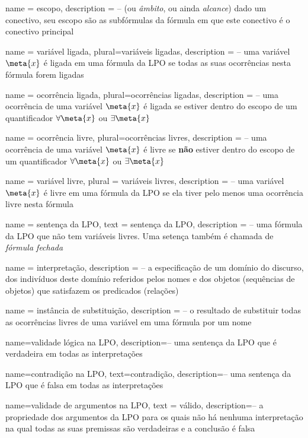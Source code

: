 {
 name = escopo,
 description = {-- (ou \textit{âmbito}, ou ainda \textit{alcance}) dado um conectivo, seu escopo são as subfórmulas da fórmula em que este conectivo é o conectivo principal}
}

{
 name = variável ligada,
 plural=variáveis ligadas,
 description = {-- uma variável $\meta{x}$ é ligada em uma fórmula da LPO se todas as suas ocorrências nesta fórmula forem ligadas}
}

{
 name = ocorrência ligada,
 plural=ocorrências ligadas,
 description = {-- uma ocorrência de uma variável $\meta{x}$ é ligada se estiver dentro do escopo de um quantificador $\forall{\meta{x}}$ ou $\exists{\meta{x}}$}
}

{
 name = ocorrência livre,
 plural=ocorrências livres,
 description = {-- uma ocorrência de uma variável $\meta{x}$ é livre se \textbf{não} estiver dentro do escopo de um quantificador $\forall{\meta{x}}$ ou $\exists{\meta{x}}$}
}

{
 name = variável livre,
 plural = variáveis livres,
 description = {-- uma variável $\meta{x}$ é livre em uma fórmula da LPO se ela tiver pelo menos uma ocorrência livre nesta fórmula}
}

{
 name = sentença da LPO,
 text = sentença da LPO,
 description = {-- uma fórmula da LPO que não tem variáveis livres. Uma setença também é chamada de \textit{fórmula fechada}}
}

{
 name = {interpretação},
 description = {-- a especificação de um domínio do discurso, dos indivíduos deste domínio referidos pelos nomes e dos objetos (sequências de objetos) que satisfazem os predicados (relações)}
}

{
 name = instância de substituição,
 description = {-- o resultado de substituir todas as ocorrências livres de uma variável em uma fórmula por um nome}
}

{
 name=validade lógica na LPO,
 description={-- uma sentença da LPO que é verdadeira em todas as interpretações}
}

{
 name=contradição na LPO,
 text=contradição,
 description={--  uma sentença da LPO que é falsa em todas as interpretações}
} 

{
 name=validade de argumentos na LPO,
 text = válido,
 description={-- a propriedade dos argumentos da LPO para os quais não há nenhuma interpretação na qual todas as suas premissas são verdadeiras e a conclusão é falsa}
}

